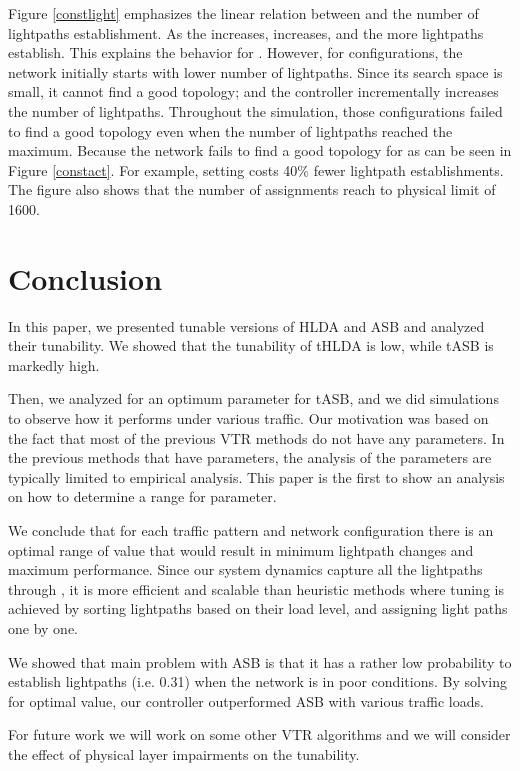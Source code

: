 \documentclass[conference]{IEEEtran}
\begin{document}
 
Figure \ref{constlight} emphasizes the linear relation between  and the number of lightpaths establishment. 
As the  increases,  increases, and the more lightpaths establish. This explains the behavior for .
However, for  configurations, the network initially starts with lower number of lightpaths.
Since its search space is small, it cannot find a good topology; and the controller incrementally increases the number of lightpaths. Throughout the simulation,
those configurations failed to find a good topology even when the number of lightpaths reached the maximum. 
Because the network fails to find a good topology for  as can be seen in Figure  \ref{constact}.
For example, setting  costs 40\% fewer lightpath establishments.
  The figure also shows  that the number of assignments reach to physical limit of 1600.
  


\section{Conclusion}\label{conclusion}
In this paper, we  presented tunable versions of HLDA and ASB 
and analyzed their tunability.
We showed that the tunability of tHLDA is   low, while tASB is markedly high.


Then, we analyzed for an optimum  parameter for tASB, and we did simulations to 
observe how  it performs under various traffic.
Our motivation was based on the fact that most of the previous VTR methods do not have any parameters. 
In the previous methods that have parameters, the analysis of the parameters are typically limited   to empirical analysis.
This paper is the first to show an analysis on how to determine a range for parameter.
 
We conclude that for each traffic pattern and network configuration there is an optimal range of  value that would result in minimum lightpath changes and maximum performance.
Since our system dynamics capture all the lightpaths through , it is more efficient and scalable than   heuristic methods where
tuning is achieved by sorting lightpaths based on their load level, and assigning light paths one by one. 
 
 
We showed that main problem
with ASB is that it has a rather low probability to establish lightpaths (i.e. 0.31) when the network is in poor conditions. By solving for optimal  value, 
our controller outperformed ASB with various traffic loads.
 
For future work we will work on some other VTR algorithms and we will consider the effect of  physical layer impairments
on the tunability.



 
\end{document}
